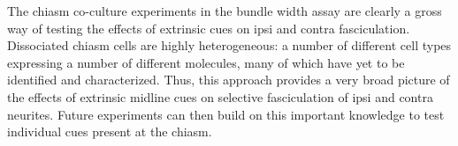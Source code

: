 The chiasm co-culture experiments in the bundle width assay are clearly a gross way of testing the effects of extrinsic cues on ipsi and contra fasciculation.
Dissociated chiasm cells are highly heterogeneous: a number of different cell types expressing a number of different molecules, many of which have yet to be identified and characterized.
Thus, this approach provides a very broad picture of the effects of extrinsic midline cues on selective fasciculation of ipsi and contra neurites.
Future experiments can then build on this important knowledge to test individual cues present at the chiasm.